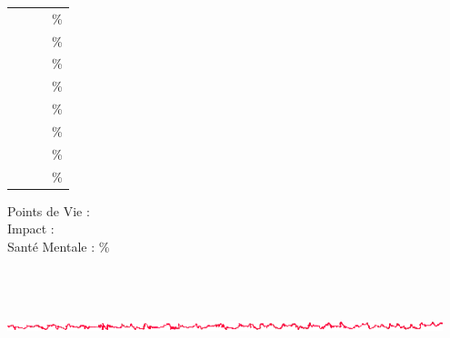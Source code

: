 \begin{minipage}[ht]{0.80\textwidth}
	\begin{minipage}[ht]{0.725\textwidth}
		\begin{tabular}[c]{ p{2.50cm} p{2.00cm} p{2.50cm} p{2.00cm} }
			\FRdefCharacterSkillsAPP	& \dotfill \CApersoAPP & \FRdefCharacterSkillsPES & \dotfill \CApersoAPP \%	\\
			\FRdefCharacterSkillsCON	& \dotfill \CApersoCON & \FRdefCharacterSkillsSTA & \dotfill \CApersoSTA \%	\\
			\FRdefCharacterSkillsDEX	& \dotfill \CApersoDEX & \FRdefCharacterSkillsAGI & \dotfill \CApersoAGI \%	\\
			\FRdefCharacterSkillsPOW	& \dotfill \CApersoFOR & \FRdefCharacterSkillsPUI & \dotfill \CApersoPUI \%	\\
			\FRdefCharacterSkillsTAI	& \dotfill \CApersoTAI & \FRdefCharacterSkillsCOR & \dotfill \CApersoCOR \%	\\
			\FRdefCharacterSkillsEDU	& \dotfill \CApersoEDU & \FRdefCharacterSkillsKNO & \dotfill \CApersoKNO \%	\\
			\FRdefCharacterSkillsINT	& \dotfill \CApersoINT & \FRdefCharacterSkillsIUI & \dotfill \CApersoIUI \%	\\
			\FRdefCharacterSkillsPOU	& \dotfill \CApersoPOU & \FRdefCharacterSkillsVOL & \dotfill \CApersoVOL \%	\\
		\end{tabular}
	\end{minipage} \hfill \begin{minipage}[ht]{0.25\textwidth}
		Points de Vie : \CApersoPV ~\\
		Impact : \CApersoIMPACT ~\\
		Sant{\'e} Mentale : \CApersoSAN \% ~\\~\\ %
	\end{minipage}
	
\end{minipage} ~\\

	\begin{center}
		\includegraphics[width=0.95\textwidth]{Filet_CA.png}
	\end{center}

